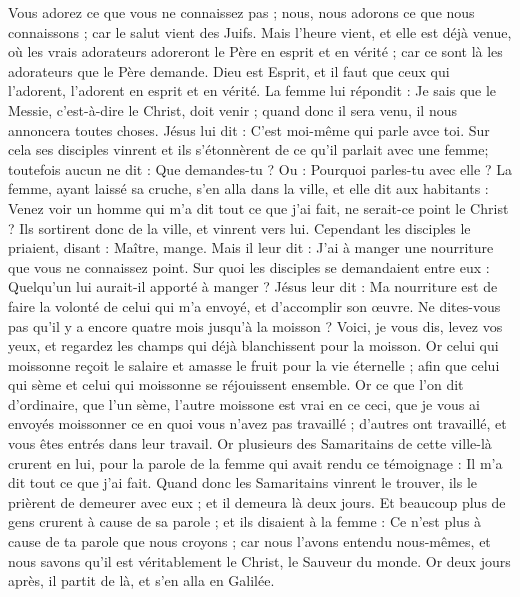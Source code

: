 \begin{multicols}{2}
Vous adorez ce que vous ne connaissez pas ; nous, nous adorons ce que nous connaissons ; car le salut vient des Juifs.
Mais l'heure vient, et elle est déjà venue, où les vrais adorateurs adoreront le Père en esprit et en vérité ; car ce sont là les adorateurs que le Père demande.
Dieu est Esprit, et il faut que ceux qui l'adorent, l'adorent en esprit et en vérité.
La femme lui répondit : Je sais que le Messie, c'est-à-dire le Christ, doit venir ; quand donc il sera venu, il nous annoncera toutes choses.
Jésus lui dit : C'est moi-même qui parle avce toi.
Sur cela ses disciples vinrent et ils s'étonnèrent de ce qu'il parlait avec une femme; toutefois aucun ne dit : Que demandes-tu ? Ou : Pourquoi parles-tu avec elle ?
La femme, ayant laissé sa cruche, s'en alla dans la ville, et elle dit aux habitants :
Venez voir un homme qui m'a dit tout ce que j'ai fait, ne serait-ce point le Christ ?
Ils sortirent donc de la ville, et vinrent vers lui.
Cependant les disciples le priaient, disant : Maître, mange.
Mais il leur dit : J'ai à manger une nourriture que vous ne connaissez point.
Sur quoi les disciples se demandaient entre eux : Quelqu'un lui aurait-il apporté à manger ?
Jésus leur dit : Ma nourriture est de faire la volonté de celui qui m'a envoyé, et d'accomplir son œuvre.
Ne dites-vous pas qu'il y a encore quatre mois jusqu'à la moisson ? Voici, je vous dis, levez vos yeux, et regardez les champs qui déjà blanchissent pour la moisson.
Or celui qui moissonne reçoit le salaire et amasse le fruit pour la vie éternelle ; afin que celui qui sème et celui qui moissonne se réjouissent ensemble.
Or ce que l'on dit d'ordinaire, que l'un sème, l'autre moissone est vrai en ce ceci,
que je vous ai envoyés moissonner ce en quoi vous n'avez pas travaillé ; d'autres ont travaillé, et vous êtes entrés dans leur travail.
Or plusieurs des Samaritains de cette ville-là crurent en lui, pour la parole de la femme qui avait rendu ce témoignage : Il m'a dit tout ce que j'ai fait.
Quand donc les Samaritains vinrent le trouver, ils le prièrent de demeurer avec eux ; et il demeura là deux jours.
Et beaucoup plus de gens crurent à cause de sa parole ;
et ils disaient à la femme : Ce n'est plus à cause de ta parole que nous croyons ; car nous l'avons entendu nous-mêmes, et nous savons qu'il est véritablement le Christ, le Sauveur du monde.
Or deux jours après, il partit de là, et s'en alla en Galilée.

\end{multicols}
